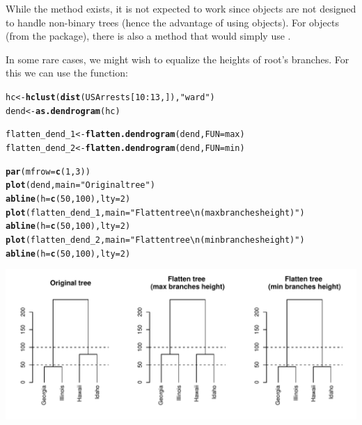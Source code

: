 \documentclass[shortnames,nojss,article]{jss}\usepackage[]{graphicx}\usepackage[]{color}
\makeatletter
\def\maxwidth{ %
  \ifdim\Gin@nat@width>\linewidth
    \linewidth
  \else
    \Gin@nat@width
  \fi
}
\newcommand{\hlnum}[1]{\textcolor[rgb]{0.686,0.059,0.569}{#1}}%
\newcommand{\hlstr}[1]{\textcolor[rgb]{0.192,0.494,0.8}{#1}}%
\newcommand{\hlopt}[1]{\textcolor[rgb]{0,0,0}{#1}}%
\newcommand{\hlstd}[1]{\textcolor[rgb]{0.345,0.345,0.345}{#1}}%
\newcommand{\hlkwb}[1]{\textcolor[rgb]{0.69,0.353,0.396}{#1}}%
\newcommand{\hlkwc}[1]{\textcolor[rgb]{0.333,0.667,0.333}{#1}}%
\newcommand{\hlkwd}[1]{\textcolor[rgb]{0.737,0.353,0.396}{\textbf{#1}}}%
\newenvironment{kframe}{%
 \def\at@end@of@kframe{}%
 \ifinner\ifhmode%
  \def\at@end@of@kframe{\end{minipage}}%
  \begin{minipage}{\columnwidth}%
 \fi\fi%
 \def\FrameCommand##1{\hskip\@totalleftmargin \hskip-\fboxsep
 \colorbox{shadecolor}{##1}\hskip-\fboxsep
     \hskip-\linewidth \hskip-\@totalleftmargin \hskip\columnwidth}%
 \MakeFramed {\advance\hsize-\width
   \@totalleftmargin\z@ \linewidth\hsize
   \@setminipage}}%
 {\par\unskip\endMakeFramed%
 \at@end@of@kframe}
\newenvironment{knitrout}{}{} %
\makeatother
\begin{document}
While the  method exists, it is not expected to work since  objects are not designed to handle non-binary trees (hence the advantage of using  objects). For  objects (from the  package), there is also a method that would simply use .

In some rare cases, we might wish to equalize the heights of root's branches. For this we can use the  function:


\begin{knitrout}
\color{fgcolor}\begin{kframe}
\begin{alltt}
\hlstd{hc} \hlkwb{<-} \hlkwd{hclust}\hlstd{(}\hlkwd{dist}\hlstd{(USArrests[}\hlnum{10}\hlopt{:}\hlnum{13}\hlstd{, ]),} \hlstr{"ward"}\hlstd{)}
\hlstd{dend} \hlkwb{<-} \hlkwd{as.dendrogram}\hlstd{(hc}\hlstd{)}

\hlstd{flatten_dend_1} \hlkwb{<-} \hlkwd{flatten.dendrogram}\hlstd{(dend,} \hlkwc{FUN} \hlstd{= max)}
\hlstd{flatten_dend_2} \hlkwb{<-} \hlkwd{flatten.dendrogram}\hlstd{(dend,} \hlkwc{FUN} \hlstd{= min}\hlstd{)}

\hlkwd{par}\hlstd{(}\hlkwc{mfrow} \hlstd{=} \hlkwd{c}\hlstd{(}\hlnum{1}\hlstd{,} \hlnum{3}\hlstd{))}
\hlkwd{plot}\hlstd{(dend,} \hlkwc{main} \hlstd{=} \hlstr{"Original tree"}\hlstd{)}
\hlkwd{abline}\hlstd{(}\hlkwc{h} \hlstd{=} \hlkwd{c}\hlstd{(}\hlnum{50}\hlstd{,} \hlnum{100}\hlstd{),} \hlkwc{lty} \hlstd{=} \hlnum{2}\hlstd{)}
\hlkwd{plot}\hlstd{(flatten_dend_1,} \hlkwc{main} \hlstd{=} \hlstr{"Flatten tree \textbackslash{}n(max branches height)"}\hlstd{)}
\hlkwd{abline}\hlstd{(}\hlkwc{h} \hlstd{=} \hlkwd{c}\hlstd{(}\hlnum{50}\hlstd{,} \hlnum{100}\hlstd{),} \hlkwc{lty} \hlstd{=} \hlnum{2}\hlstd{)}
\hlkwd{plot}\hlstd{(flatten_dend_2,} \hlkwc{main} \hlstd{=} \hlstr{"Flatten tree \textbackslash{}n(min branches height)"}\hlstd{)}
\hlkwd{abline}\hlstd{(}\hlkwc{h} \hlstd{=} \hlkwd{c}\hlstd{(}\hlnum{50}\hlstd{,} \hlnum{100}\hlstd{),} \hlkwc{lty} \hlstd{=} \hlnum{2}\hlstd{)}
\end{alltt}
\end{kframe}

{\centering \includegraphics[width=\maxwidth]{figure/unnamed-chunk-25} 

}



\end{knitrout}
\end{document}
